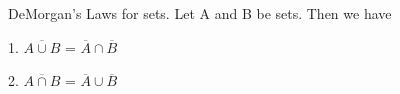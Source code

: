 \documentclass[12pt]{article}
\newenvironment{theorem}[2][Theorem]{\begin{trivlist}
\item[\hskip \labelsep {\bfseries #1}\hskip \labelsep {\bfseries #2.}]}{\end{trivlist}}
\begin{document}
 

\rhead{\today}
 
 
\begin{theorem}{2.3} %
DeMorgan's Laws for sets. Let A and B be sets. Then we have

1. $\overline{A \cup B}$ = $\overline{A} \cap \overline{B}$

2. $\overline{A \cap B}$ = $\overline{A} \cup \overline{B}$

\end{theorem} 
\end{document}

